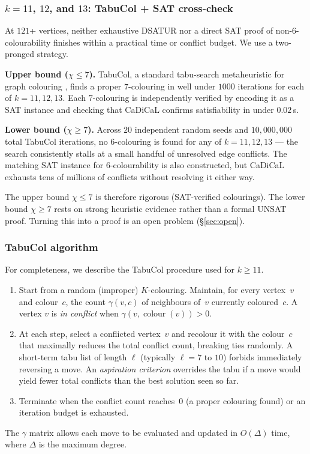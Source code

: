 \documentclass[12pt]{article}
\theoremstyle{definition}
\theoremstyle{remark}
\begin{document}
\subsubsection*{$k = 11$, $12$, and $13$: TabuCol + SAT cross-check}

At $121$+ vertices, neither exhaustive DSATUR nor a direct SAT proof of
non-$6$-colourability finishes within a practical time or conflict budget.
We use a two-pronged strategy.

\medskip\noindent
\textbf{Upper bound ($\chi \le 7$).}
TabuCol, a standard tabu-search metaheuristic for graph colouring
\cite{hertz1987}, finds a proper $7$-colouring in well under $1000$
iterations for each of $k = 11, 12, 13$.  Each $7$-colouring is
independently verified by encoding it as a SAT instance and checking that
CaDiCaL confirms satisfiability in under $0.02$\,s.

\medskip\noindent
\textbf{Lower bound ($\chi \ge 7$).}
Across $20$ independent random seeds and $10{,}000{,}000$ total TabuCol
iterations, no $6$-colouring is found for any of $k = 11, 12, 13$ --- the
search consistently stalls at a small handful of unresolved edge conflicts.
The matching SAT instance for $6$-colourability is also constructed, but
CaDiCaL exhausts tens of millions of conflicts without resolving it either
way.

\medskip
The upper bound $\chi \le 7$ is therefore rigorous (SAT-verified colourings).
The lower bound $\chi \ge 7$ rests on strong heuristic evidence rather than
a formal UNSAT proof.  Turning this into a proof is an open problem
(\S\ref{sec:open}).

\subsubsection*{TabuCol algorithm}

For completeness, we describe the TabuCol procedure used for $k \ge 11$.
\begin{enumerate}
  \item Start from a random (improper) $K$-colouring.  Maintain, for every
    vertex~$v$ and colour~$c$, the count $\gamma(v,c)$ of neighbours of~$v$
    currently coloured~$c$.  A vertex $v$ is \emph{in conflict} when
    $\gamma(v, \operatorname{colour}(v)) > 0$.
  \item At each step, select a conflicted vertex~$v$ and recolour it with
    the colour~$c$ that maximally reduces the total conflict count, breaking
    ties randomly.  A short-term tabu list of length $\ell$ (typically
    $\ell = 7$ to $10$) forbids immediately reversing a move.  An
    \emph{aspiration criterion} overrides the tabu if a move would yield
    fewer total conflicts than the best solution seen so far.
  \item Terminate when the conflict count reaches~$0$ (a proper colouring
    found) or an iteration budget is exhausted.
\end{enumerate}
The $\gamma$ matrix allows each move to be evaluated and updated in $O(\Delta)$
time, where $\Delta$ is the maximum degree.
\end{document}
